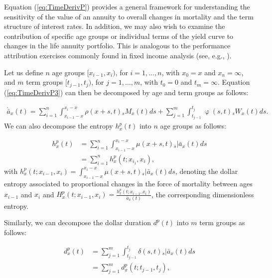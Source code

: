 \documentclass[12pt]{article}
\begin{document}
 
 Equation (\ref{eq:TimeDerivP}) provides a general framework for understanding the sensitivity of the value of an annuity to overall changes in mortality and the term structure of interest rates. In addition, we may also wish to examine the contribution of specific age groups or individual terms of the yield curve to changes in the life annuity portfolio. This is analogous to the performance attribution exercises commonly found in fixed income analysis (see, e.g., \citet{Daul2012}).
 
 Let us define $n$ age groups $[x_{i-1}, x_i)$, for $i=1,\ldots,n$, with $x_0 = x$ and $x_n = \infty$, and $m$ term groups $[t_{j-1}, t_j)$, for $j=1,\ldots,m$, with $t_0 = 0$ and $t_m = \infty$. Equation (\ref{eq:TimeDerivP3}) can then be decomposed by age and term groups as follows:
 

\begin{equation}\label{eq:TimeDerivAge}
\begin{split}
 \acute{\bar{a}}_x(t) = \sum_{i=1}^n\int_{x_{i-1}-x}^{x_i-x}  \rho(x+s,t) {}_sM_x(t)  ds +\sum_{j=1}^m\int_{t_{j-1}}^{t_j}   \upvarphi(s,t) {}_sW_x(t)  ds.  
\end{split}
\end{equation}
We can also decompose the entropy $h_x^p(t)$ into $n$ age groups as follows:

\begin{equation} \label{eq:EntropyAge}
\begin{split}
{h}^{p}_{x}(t) &=  \sum_{i=1}^n\int_{x_{i-1}-x}^{x_i-x} \mu(x+s,t)   {}_s|\bar{a}_x(t) ds \\
&=  \sum_{i=1}^n {h}^{p}_{x}(t;x_{i_1},x_{i}),
\end{split}
\end{equation}
with ${h}^{p}_{x}(t;x_{i-1},x_{i})=\int_{x_{i-1}-x}^{x_i-x} \mu(x+s,t)   {}_s|\bar{a}_x(t) ds$, denoting the dollar entropy associated to proportional changes in the force of mortality between ages $x_{i-1}$ and $x_{i}$ and ${H}^{p}_{x}(t;x_{i-1},x_{i}) = \frac{{h}^{p}_{x}(t;x_{i-1},x_{i})}{\bar{a}_x(t)}$, the corresponding dimensionless entropy. 

Similarly, we can decompose the dollar duration $d^p(t)$ into $m$ term groups as follows:

\begin{equation}\label{eq:DurationAge}
\begin{split}
{d}^{p}_{x}(t) &= \sum_{j=1}^m\int_{t_{j-1}}^{t_j} \delta(s,t) {}_s|\bar{a}_x(t)ds \\
&= \sum_{j=1}^m {d}^{p}_{x}(t;t_{j-1},t_{j}),
\end{split}
\end{equation}
\end{document}
